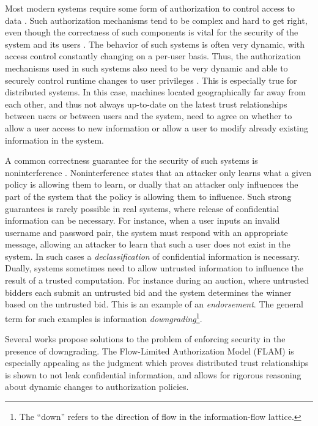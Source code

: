 Most modern systems require some form of authorization to control access to data \cite{Menezes:1996:HAC:548089}. Such authorization mechanisms tend to be complex and hard to get right, even though the correctness of such components is vital for the security of the system and its users \cite{Ferraiolo:1999:RAC:300830.300834}. The behavior of such systems is often very dynamic, with access control constantly changing on a per-user basis. Thus, the authorization mechanisms used in such systems also need to be very dynamic and able to securely control runtime changes to user privileges \cite{Ferraiolo:1999:RAC:300830.300834}.
This is especially true for distributed systems. In this case, machines located geographically far away from each other, and thus not always up-to-date on the latest trust relationships between users or between users and the system, need to agree on whether to allow a user access to new information or allow a user to modify already existing information in the system.

A common correctness guarantee for the security of such systems is noninterference \cite{6234468}. Noninterference states that an attacker only learns what a given policy is allowing them to learn, or dually that an attacker only influences the part of the system that the policy is allowing them to influence. Such strong guarantees is rarely possible in real systems, where release of confidential information can be necessary. For instance, when a user inputs an invalid username and password pair, the system must respond with an appropriate message, allowing an attacker to learn that such a user does not exist in the system. In such cases a \emph{declassification} of confidential information is necessary. Dually, systems sometimes need to allow untrusted information to influence the result of a trusted computation. For instance during an auction, where untrusted bidders each submit an untrusted bid and the system determines the winner based on the untrusted bid. This is an example of an \emph{endorsement}. The general term for such examples is information \emph{downgrading}\footnote{The ``down'' refers to the direction of flow in the information-flow lattice.}.

Several works \cite{Efstathopoulos:2005:LEP:1095810.1095813, Krohn:2007:IFC:1294261.1294293, Arden:2015:FA:2859845.2859998, Hicks05dynamicupdating} propose solutions to the problem of enforcing security in the presence of downgrading. The Flow-Limited Authorization Model (FLAM) \cite{Arden:2015:FA:2859845.2859998} is especially appealing as the judgment which proves distributed trust relationships is shown to not leak confidential information, and allows for rigorous reasoning about dynamic changes to authorization policies.


